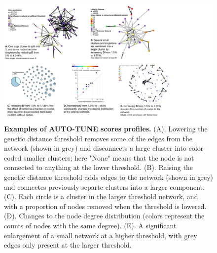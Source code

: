 \documentclass[utf8]{FrontiersinHarvard} %
\begin{document}
\begin{figure}[h!]
	\centering
	\includegraphics[width=1.\textwidth]{figures/examples.pdf} 
	\vspace{0.01in}
	\caption{\textbf{Examples of AUTO-TUNE scores profiles.}
		(A). Lowering the genetic distance threshold removes some of the edges from the network (shown in grey) and disconnects a large cluster into color-coded smaller clusters; here "None" means that the node is not connected to anything at the lower threshold. (B). Raising the genetic distance threshold adds edges to the network (shown in grey) and connectes previously separte clusters into a larger component. (C). Each circle is a cluster in the larger threshold network, and with a proportion of nodes removed when the threshold is lowered. (D). Changes to the node degree distribution (colors represent the counts of nodes with the same degree). (E). A significant enlargement of a small network at a higher threshold, with grey edges only present at the larger threshold. }
	\label{fig:examples}
\end{figure}
\end{document}
